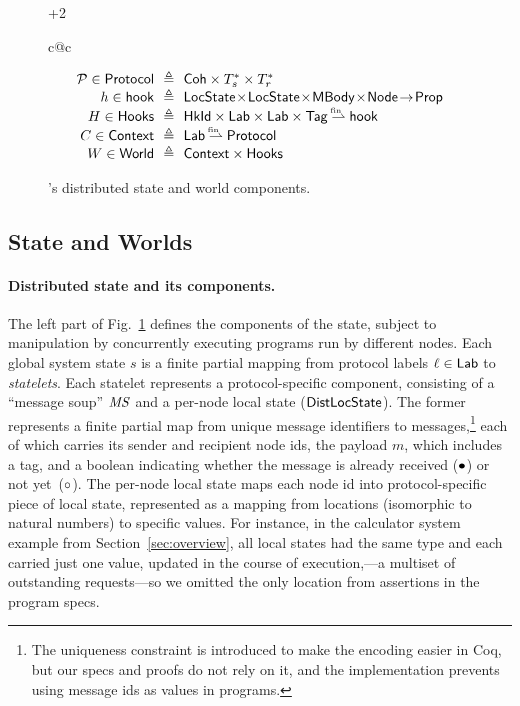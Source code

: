 \begin{figure}[t]
{\begin{varwidth}{\dimexpr\textwidth+2\fboxrule\relax}
\begin{tabular}{c@{\!\!\!\!\!\!\!\!\!\!}c}
\begin{minipage}{0.5\linewidth}
{{\[\begin{array}{r@{\ \ }c@{\ \ }l}
  \ppr \in \Protocol & \eqdef & \mathsf{Coh} \times \Transitions_s^*
                                      \times \Transitions_r^* \\
  h \in \hook & \eqdef & \LocalState \!\times\! \LocalState \!\times\! \Mbody
                         \!\times\! \Node \!\fun\! \Prop \\
  H \in \Hooks & \eqdef & \HkId \times \Lab \times \Lab \times \Tag \pmap \hook \\
  C \in \Context & \eqdef & \Lab \pmap \Protocol \\
  W \in \World & \eqdef & \Context \times \Hooks
\end{array}
\]
}}
\end{minipage}
\end{tabular}
\end{varwidth}}
\vspace{-5pt}
\caption{\disel's distributed state and world components.}
\label{fig:sspace}
\end{figure}



\subsection{State and Worlds}
\label{sec:model}

\paragraph{Distributed state and its components.}

The left part of Fig.~\ref{fig:sspace} defines the components of the
state, subject to manipulation by concurrently executing programs run
by different nodes. Each global system state $s$ is a finite partial
mapping from protocol labels $\ell \in \mathsf{Lab}$ to \emph{statelets}. Each
statelet represents a protocol-specific component, consisting of a
``message soup'' $\mathit{MS}$ and a per-node local state ($\mathsf{DistLocState}$). The
former represents a finite partial map from unique message identifiers
to messages,\footnote{The uniqueness constraint is introduced to make
  the encoding easier in Coq, but our specs and proofs do not rely on
  it, and the implementation prevents using message ids as values in
  programs.} each of which carries its sender and recipient node ids,
the payload $m$, which includes a tag, and a boolean indicating
whether the message is already received ($\bullet$) or not
yet~($\circ$).
%
The per-node local state maps each node id into protocol-specific
piece of local state, represented as a mapping from locations
(isomorphic to natural numbers) to specific values. For instance, in
the calculator system example from Section~\ref{sec:overview}, all
local states had the same type and each carried just one value,
updated in the course of execution,---a multiset of outstanding
requests---so we omitted the only location from assertions in the
program specs.



